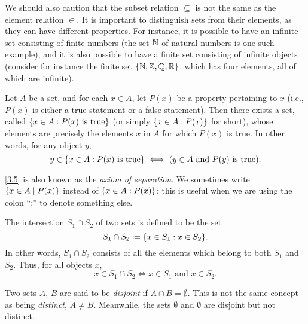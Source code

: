 \begin{rmk}\label{3.1.21}
  We should also caution that the subset relation \(\subseteq\) is not the same as the element relation \(\in\).
  It is important to distinguish sets from their elements, as they can have different properties.
  For instance, it is possible to have an infinite set consisting of finite numbers (the set \(\mathbb{N}\) of natural numbers is one such example), and it is also possible to have a finite set consisting of infinite objects
  (consider for instance the finite set \(\left\lbrace\mathbb{N}, \mathbb{Z}, \mathbb{Q}, \mathbb{R}\right\rbrace\), which has four elements, all of which are infinite).
\end{rmk}

\begin{ax}\label{3.5}
  Let \(A\) be a set, and for each \(x \in A\), let \(P(x)\) be a property pertaining to \(x\) (i.e., \(P(x)\) is either a true statement or a false statement).
  Then there exists a set, called \(\left\lbrace x \in A : P(x) \text{ is true}\right\rbrace\) (or simply \(\left\lbrace x \in A : P(x)\right\rbrace\) for short), whose elements are precisely the elements \(x\) in \(A\) for which \(P(x)\) is true.
  In other words, for any object \(y\),
  \[
    y \in \left\lbrace x \in A : P(x) \text{ is true}\right\rbrace \iff (y \in A \text{ and } P(y) \text{ is true}).
  \]
\end{ax}

\begin{note}
  \cref{3.5} is also known as the \emph{axiom of separation}.
  We sometimes write \(\left\lbrace x \in A \mid P(x)\right\rbrace\) instead of \(\left\lbrace x \in A : P(x)\right\rbrace\);
  this is useful when we are using the colon ``:'' to denote something else.
\end{note}

\setcounter{thm}{22}
\begin{defn}[Intersections]\label{3.1.23}
  The intersection \(S_1 \cap S_2\) of two sets is defined to be the set
  \[
    S_1 \cap S_2 \coloneqq \set{x \in S_1 : x \in S_2}.
  \]
  In other words, \(S_1 \cap S_2\) consists of all the elements which belong to both \(S_1\) and \(S_2\).
  Thus, for all objects \(x\),
  \[
    x \in S_1 \cap S_2 \iff x \in S_1 \text{ and } x \in S_2.
  \]
\end{defn}

\begin{note}
  Two sets \(A\), \(B\) are said to be \emph{disjoint} if \(A \cap B = \emptyset\).
  This is not the same concept as being \emph{distinct}, \(A \neq B\).
  Meanwhile, the sets \(\emptyset\) and \(\emptyset\) are disjoint but not distinct.
\end{note}

